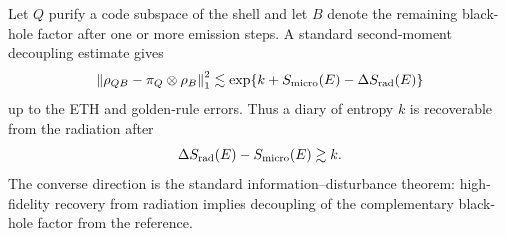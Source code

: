 \documentclass[12pt]{article}
\newcommand{\be}{\begin{equation}}
\newcommand{\ee}{\end{equation}}
\newcommand{\Smicro}{S_{\rm micro}}
\begin{document}
Let $Q$ purify a code subspace of the shell and let $B$ denote the remaining
black-hole factor after one or more emission steps.  A standard second-moment
decoupling estimate
\cite{HaydenPreskill2007,HaydenHorodeckiWinterYard2008,Dupuis2014} gives
\be
  \left\|\rho_{QB}-\pi_Q\otimes\rho_B\right\|_1^2
  \lesssim
  \exp\{k+\Smicro(E)-\Delta S_{\rm rad}(E)\}
\ee
up to the ETH and golden-rule errors.  Thus a diary of entropy $k$ is
recoverable from the radiation after
\be
  \Delta S_{\rm rad}(E)-\Smicro(E)\gtrsim k .
\ee
The converse direction is the standard information--disturbance theorem:
high-fidelity recovery from radiation implies decoupling of the complementary
black-hole factor from the reference.



\end{document}
